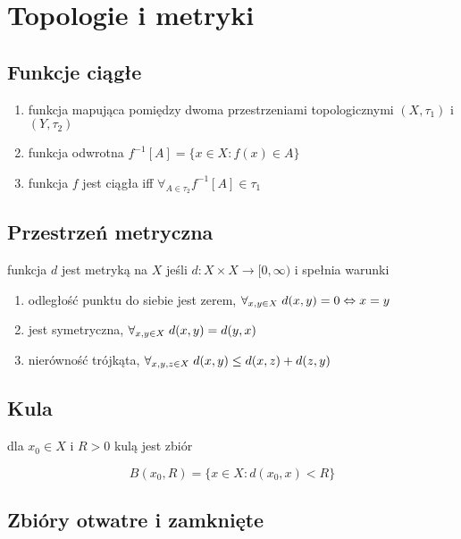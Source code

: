 \documentclass{article}
\begin{document}
\section{Topologie i metryki}

\subsection{Funkcje ciągłe}

\begin{enumerate}
\item funkcja mapująca pomiędzy dwoma przestrzeniami topologicznymi $(X, \tau_1)$ i $(Y, \tau_2)$
\item funkcja odwrotna $f^{-1}[A] = \{x \in X: f(x) \in A\}$
\item funkcja $f$ jest ciągła iff $\forall_{A \in \tau_2} f^{-1}[A] \in \tau_1$
\end{enumerate}

\subsection{Przestrzeń metryczna}

funkcja $d$ jest metryką na $X$ jeśli $d: X \times X \to [0,\infty)$ i spełnia warunki

\begin{enumerate}
\item odległość punktu do siebie jest zerem, $\forall_{x, y \in X} \mkern5mu d(x,y) = 0 \Leftrightarrow x = y $
\item jest symetryczna, $\forall_{x, y \in X} \mkern5mu d(x,y) = d(y,x)$
\item nierówność trójkąta, $\forall_{x, y, z \in X} \mkern5mu d(x,y) \leq d(x,z) + d(z,y)$
\end{enumerate}

\subsection{Kula}

dla $x_0 \in X$ i $R > 0$ kulą jest zbiór

$$B(x_0, R) = \{x \in X: d(x_0, x) < R\}$$

\subsection{Zbióry otwatre i zamknięte}
\end{document}
